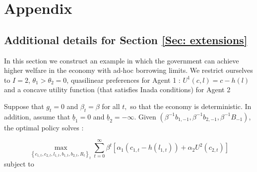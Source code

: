 \documentclass[thmsb,11pt]{article}
\begin{document}
%
%

\smallskip

\smallskip \pagebreak

\smallskip

\section{Appendix}

\subsection{Additional details for Section \ref{Sec: extensions}}
\label{appndx: borrowing constraints example}
In this section we construct an example in which the government can achieve
higher welfare in the economy with ad-hoc borrowing limits.  We restrict ourselves to $I=2$, $\theta_1>\theta_2=0$, quasilinear preferences for Agent 1 : $U^1(c,l)=c-h(l)$ and a concave utility function (that satisfies Inada conditions) for Agent 2

\smallskip

Suppose that $g_{t}=0$ and $\beta_t=\beta$ for all $t,$ so that the economy is deterministic. In addition, assume that $\underline{b}_{1}=0$ and $\underline{b}_{2}=-\infty .$ Given $\left( \beta ^{-1}{b}_{1,-1},\beta ^{-1}{b}%
_{2,-1},\beta ^{-1}{B}_{-1}\right) $, the optimal policy solves :

\begin{equation}
 \label{obj: borrowingconstexample}
 \max_{\left \{ c_{1,t},c_{2,t},l_{1,t},b_{1,t},b_{2,t},R_{t}\right \}
_{t}}\sum_{t=0}^{\infty }\beta ^{t}\left[ \alpha _{1}\left(
c_{1,t}-h(l_{1,t})\right) +\alpha _{2}U^2(c_{2,t})\right]
 \end{equation}
subject to
\end{document}
